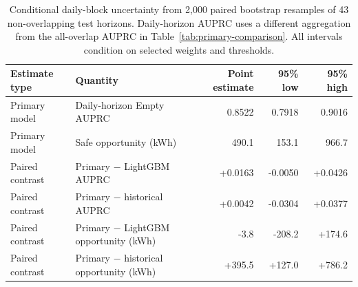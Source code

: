 \begin{table}[!t]
\caption{Conditional daily-block uncertainty from 2,000 paired bootstrap resamples of 43 non-overlapping test horizons. Daily-horizon AUPRC uses a different aggregation from the all-overlap AUPRC in Table~\ref{tab:primary-comparison}. All intervals condition on selected weights and thresholds.}
\label{tab:uncertainty}
\centering
\small
\begin{tabular}{llrrr}
\toprule
Estimate type & Quantity & Point estimate & 95\% low & 95\% high \\
\midrule
Primary model & Daily-horizon Empty AUPRC & 0.8522 & 0.7918 & 0.9016 \\
Primary model & Safe opportunity (kWh) & 490.1 & 153.1 & 966.7 \\
Paired contrast & Primary $-$ LightGBM AUPRC & +0.0163 & -0.0050 & +0.0426 \\
Paired contrast & Primary $-$ historical AUPRC & +0.0042 & -0.0304 & +0.0377 \\
Paired contrast & Primary $-$ LightGBM opportunity (kWh) & -3.8 & -208.2 & +174.6 \\
Paired contrast & Primary $-$ historical opportunity (kWh) & +395.5 & +127.0 & +786.2 \\
\bottomrule
\end{tabular}
\end{table}
